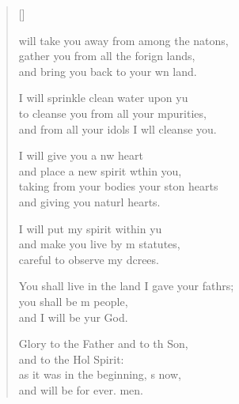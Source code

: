 \settowidth{\versewidth}{You shall live in the land I gave your fathers; +}
\begin{verse}[\versewidth]
  \begin{patverse}
 will take you away from among the nat\pointup{\i}ons,\Flex\\
gather you from all the forign lands,\Med\\
and bring you back to your wn land.

I will sprinkle clean water upon yu\Flex\\
to cleanse you from all your \pointup{\i}mpurities,\Med\\
and from all your idols I w\pointup{\i}ll cleanse you.

I will give you a nw heart\Med\\
and place a new spirit w\pointup{\i}thin you,\\
taking from your bodies your ston hearts\Med\\
and giving you naturl hearts.

I will put my spirit within yu\Flex\\
and make you live by m statutes,\Med\\
careful to observe my dcrees.

You shall live in the land I gave your fathrs;\Flex\\
you shall be m people,\Med\\
and I will be yur God.

Glory to the Father and to th Son,\Med\\
and to the Hol Spirit:\\
as it was in the beginning, \pointup{\i}s now,\Med\\
and will be for ever. men.
  \end{patverse}
  \end{verse}
